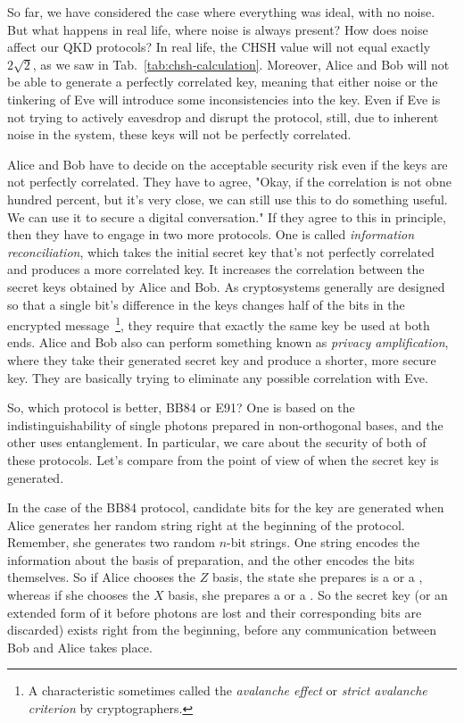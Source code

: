 So far, we have considered the case where everything was ideal, with no noise. But what happens in real life, where noise is always present? How does noise affect our QKD protocols? In real life, the CHSH value will not equal exactly $2\sqrt{2}$, as we saw in Tab.~\ref{tab:chsh-calculation}.  Moreover, Alice and Bob will not be able to generate a perfectly correlated key, meaning that either noise or the tinkering of Eve will introduce some inconsistencies into the key. Even if Eve is not trying to actively eavesdrop and disrupt the protocol, still, due to inherent noise in the system, these keys will not be perfectly correlated.

Alice and Bob have to decide on the acceptable security risk even if the keys are not perfectly correlated. They have to agree, "Okay, if the correlation is not obne hundred percent, but it's very close, we can still use this to do something useful. We can use it to secure a digital conversation." If they agree to this in principle, then they have to engage in two more protocols. One is called  \emph{information reconciliation}, which takes the initial secret key that's not perfectly correlated and produces a more correlated key.  It increases the correlation between the secret keys obtained by Alice and Bob.  As cryptosystems generally are designed so that a single bit's difference in the keys changes half of the bits in the encrypted message~\footnote{A characteristic sometimes called the \emph{avalanche effect} or \emph{strict avalanche criterion} by cryptographers.}, they require that exactly the same key be used at both ends.  Alice and Bob also can perform something known as \emph{privacy amplification}, where they take their generated secret key and produce a shorter, more secure key. They are basically trying to eliminate any possible correlation with Eve.

So, which protocol is better, BB84 or E91? One is based on the indistinguishability of single photons prepared in non-orthogonal bases, and the other uses entanglement. In particular, we care about the security of both of these protocols. Let's compare from the point of view of when the secret key is generated.

In the case of the BB84 protocol, candidate bits for the key are generated when Alice generates her random string right at the beginning of the protocol. Remember, she generates two random $n$-bit strings. One string encodes the information about the basis of preparation, and the other encodes the bits themselves. So if Alice chooses the $Z$ basis, the state she prepares is a  or a , whereas if she chooses the $X$ basis, she prepares a \ket{+} or a \ket{-}. So the secret key (or an extended form of it before photons are lost and their corresponding bits are discarded) exists right from the beginning, before any communication between Bob and Alice takes place.

